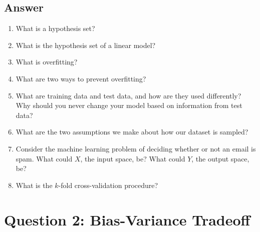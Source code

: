 \documentclass[
	12pt, %
]{fphw}
\begin{document}
\subsection*{Answer}
\begin{enumerate}
	\itemsep0.3em
	\parskip0.3em
	\item What is a hypothesis set?
	\item What is the hypothesis set of a linear model?
	\item What is overfitting?
	\item What are two ways to prevent overfitting?
	\item What are training data and test data, and how are they used differently? Why should you never change your model based on information from test data?
	\item What are the two assumptions we make about how our dataset is sampled?
	\item Consider the machine learning problem of deciding whether or not an email is spam. What could \(X\), the input space, be? What could \(Y\), the output space, be?
	\item What is the \(k\)-fold cross-validation procedure?
\end{enumerate}


\section*{Question 2: Bias-Variance Tradeoff}
\end{document}

